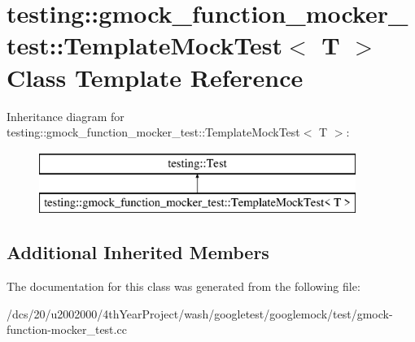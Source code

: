 \hypertarget{classtesting_1_1gmock__function__mocker__test_1_1TemplateMockTest}{}\section{testing\+:\+:gmock\+\_\+function\+\_\+mocker\+\_\+test\+:\+:Template\+Mock\+Test$<$ T $>$ Class Template Reference}
\label{classtesting_1_1gmock__function__mocker__test_1_1TemplateMockTest}
Inheritance diagram for testing\+:\+:gmock\+\_\+function\+\_\+mocker\+\_\+test\+:\+:Template\+Mock\+Test$<$ T $>$\+:\begin{figure}[H]
\begin{center}
\leavevmode
\includegraphics[height=2.000000cm]{classtesting_1_1gmock__function__mocker__test_1_1TemplateMockTest}
\end{center}
\end{figure}
\subsection*{Additional Inherited Members}


The documentation for this class was generated from the following file\+:\begin{DoxyCompactItemize}
\item 
/dcs/20/u2002000/4th\+Year\+Project/wash/googletest/googlemock/test/gmock-\/function-\/mocker\+\_\+test.\+cc\end{DoxyCompactItemize}
